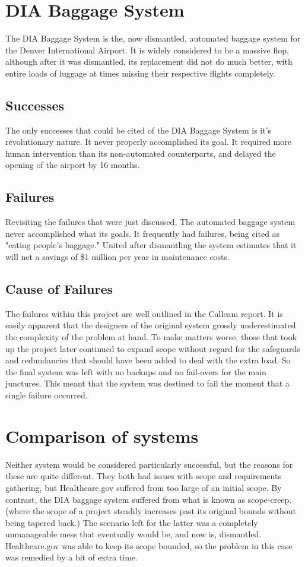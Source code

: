 \documentclass[conference]{IEEEtran}
\begin{document}
\section{DIA Baggage System}
	The DIA Baggage System is the, now dismantled, automated baggage system for the Denver International Airport. It is widely considered to be a massive flop, although after it was dismantled, its replacement did not do much better, with entire loads of luggage at times missing their respective flights completely. \cite{dia_denverpost} 
	\subsection{Successes}
		The only successes that could be cited of the DIA Baggage System is it's revolutionary nature. It never properly accomplished its goal. It required more human intervention than its non-automated counterparts, and delayed the opening of the airport by 16 months.
	\subsection{Failures}
		Revisiting the failures that were just discussed, The automated baggage system never accomplished what its goals. It frequently had failures, being cited as "eating people's baggage."\cite{dia_calleam} United after dismantling the system estimates that it will net a savings of \$1 million per year in maintenance costs.\cite{dia_nbc} 
	\subsection{Cause of Failures}
		The failures within this project are well outlined in the Calleam report. It is easily apparent that the designers of the original system grossly underestimated the complexity of the problem at hand. To make matters worse, those that took up the project later continued to expand scope without regard for the safeguards and redundancies that should have been added to deal with the extra load. So the final system was left with no backups and no fail-overs for the main junctures. This meant that the system was destined to fail the moment that a single failure occurred. \cite{dia_calleam}
\section{Comparison of systems}
	Neither system would be considered particularly successful, but the reasons for these are quite different. They both had issues with scope and requirements gathering, but Healthcare.gov suffered from too large of an initial scope. By contrast, the DIA baggage system suffered from what is known as scope-creep. (where the scope of a project steadily increases past its original bounds without being tapered back.) The scenario left for the latter was a completely unmanageable mess that eventually would be, and now is, dismantled. Healthcare.gov was able to keep its scope bounded, so the problem in this case was remedied by a bit of extra time. 
\end{document}
